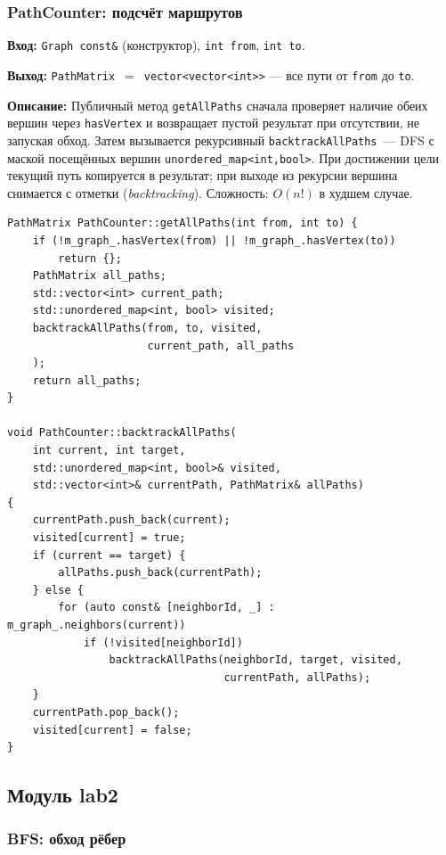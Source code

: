 \subsubsection{PathCounter: подсчёт маршрутов}

\textbf{Вход:} \texttt{Graph const\&} (конструктор), \texttt{int from},
\texttt{int to}.

\textbf{Выход:} \texttt{PathMatrix}~$=$~\texttt{vector<vector<int>>} --- все пути от \texttt{from} до \texttt{to}.

\textbf{Описание:} Публичный метод \texttt{getAllPaths} сначала проверяет
наличие обеих вершин через \texttt{hasVertex} и возвращает пустой результат
при отсутствии, не запуская обход. Затем вызывается рекурсивный
\texttt{backtrackAllPaths}~--- DFS с маской посещённых вершин
\texttt{unordered\_map<int,bool>}. При достижении цели текущий путь
копируется в результат; при выходе из рекурсии вершина снимается с
отметки (\emph{backtracking}). Сложность: $O(n!)$ в худшем случае.

\begin{lstlisting}[style=cppstyle, caption={Backtracking-поиск маршрутов (PathCounter.cc)}]
PathMatrix PathCounter::getAllPaths(int from, int to) {
    if (!m_graph_.hasVertex(from) || !m_graph_.hasVertex(to))
        return {};
    PathMatrix all_paths;
    std::vector<int> current_path;
    std::unordered_map<int, bool> visited;
    backtrackAllPaths(from, to, visited, 
                      current_path, all_paths
    );
    return all_paths;
}

void PathCounter::backtrackAllPaths(
    int current, int target,
    std::unordered_map<int, bool>& visited,
    std::vector<int>& currentPath, PathMatrix& allPaths)
{
    currentPath.push_back(current);
    visited[current] = true;
    if (current == target) {
        allPaths.push_back(currentPath);
    } else {
        for (auto const& [neighborId, _] : m_graph_.neighbors(current))
            if (!visited[neighborId])
                backtrackAllPaths(neighborId, target, visited, 
                                  currentPath, allPaths);
    }
    currentPath.pop_back();
    visited[current] = false;
}
\end{lstlisting}

\subsection{Модуль lab2}

\subsubsection{BFS: обход рёбер}

